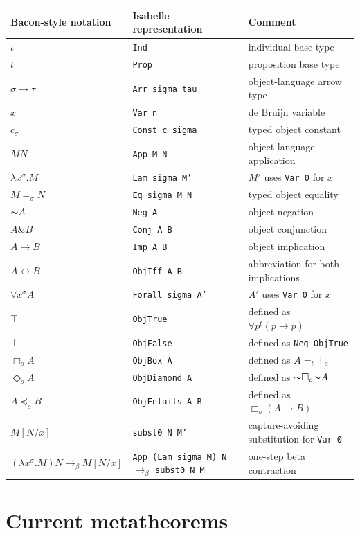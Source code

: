 \documentclass[12pt,leqno]{article}
\newcommand{\AND}{\ensuremath{\mathbin{\&}}}
\newcommand{\IFF}{\ensuremath{\leftrightarrow}}
\newcommand{\IC}{\ensuremath{\rightarrow}}
\newcommand{\NOT}{\ensuremath{\text{$\thicksim$}}}
\newcommand{\code}[1]{%
  \begingroup
  \def\_{\char`\_\allowbreak}%
  \texttt{#1}%
  \endgroup
}
\newcommand{\betastep}{\mathrel{\to_\beta}}
\begin{document}
\begin{longtable}{>{\raggedright\arraybackslash}p{}
                  >{\raggedright\arraybackslash}p{}
                  >{\raggedright\arraybackslash}p{}}
\hline
\textbf{Bacon-style notation}
& \textbf{Isabelle representation}
& \textbf{Comment}\\
\hline
$\iota$ & \code{Ind} & individual base type\\
$t$ & \code{Prop} & proposition base type\\
$\sigma\to\tau$ & \code{Arr sigma tau} & object-language arrow type\\
$x$ & \code{Var n} & de Bruijn variable\\
$c_\sigma$ & \code{Const c sigma} & typed object constant\\
$MN$ & \code{App M N} & object-language application\\
$\lambda x^\sigma.M$ & \code{Lam sigma M'} & $M'$ uses \code{Var 0} for $x$\\
$M=_\sigma N$ & \code{Eq sigma M N} & typed object equality\\
$\NOT A$ & \code{Neg A} & object negation\\
$A\AND B$ & \code{Conj A B} & object conjunction\\
$A\IC B$ & \code{Imp A B} & object implication\\
$A\IFF B$ & \code{ObjIff A B} & abbreviation for both implications\\
$\forall x^\sigma A$ & \code{Forall sigma A'} & $A'$ uses \code{Var 0} for $x$\\
$\top$ & \code{ObjTrue} & defined as $\forall p^t(p\IC p)$\\
$\bot$ & \code{ObjFalse} & defined as \code{Neg ObjTrue}\\
$\Box_o A$ & \code{ObjBox A} & defined as $A=_t\top_o$\\
$\Diamond_o A$ & \code{ObjDiamond A} & defined as $\NOT\Box_o\NOT A$\\
$A\preceq_o B$ & \code{ObjEntails A B} & defined as $\Box_o(A\IC B)$\\
$M[N/x]$ & \code{subst0 N M'} & capture-avoiding substitution for \code{Var 0}\\
$(\lambda x^\sigma.M)N\betastep M[N/x]$
& \code{App (Lam sigma M) N} $\betastep$ \code{subst0 N M}
& one-step beta contraction\\
\hline
\end{longtable}

\section{Current metatheorems}
\end{document}
